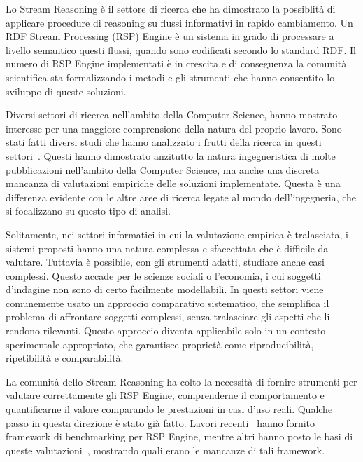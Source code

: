 Lo Stream Reasoning \`e  il settore di ricerca che ha dimostrato la possiblit\`a di applicare procedure di reasoning su flussi informativi in rapido cambiamento. Un RDF Stream Processing (RSP) Engine \`e  un sistema in grado di processare a livello semantico questi flussi, quando sono codificati secondo lo standard RDF. Il numero di RSP Engine implementati \`e  in crescita e di conseguenza la comunit\`a scientifica sta formalizzando i metodi e gli strumenti che hanno consentito lo sviluppo di queste soluzioni.

Diversi settori di ricerca nell'ambito della Computer Science, hanno mostrato interesse per una maggiore comprensione della natura del proprio lavoro. Sono stati fatti diversi studi che hanno analizzato i frutti della ricerca in questi settori~\cite{Tichy:1995:EEC:209090.209093, Wainer:2009:EEC:1518331.1518552}. Questi hanno dimostrato anzitutto la natura ingegneristica di molte pubblicazioni nell'ambito della Computer Science, ma anche una discreta mancanza di valutazioni empiriche delle soluzioni implementate. Questa \`e  una differenza evidente con le altre aree di ricerca legate al mondo dell'ingegneria, che si focalizzano su questo tipo di analisi.

Solitamente, nei settori informatici in cui la valutazione empirica \`e tralasciata, i sistemi proposti hanno una natura complessa e sfaccettata che \`e difficile da valutare. Tuttavia \`e  possibile, con gli strumenti adatti, studiare anche casi complessi. Questo accade per le scienze sociali o l'economia, i cui soggetti d'indagine non sono di certo facilmente modellabili. In questi settori viene comunemente usato un approccio comparativo sistematico, che semplifica il problema di affrontare soggetti complessi, senza tralasciare gli aspetti che li rendono rilevanti. Questo approccio diventa applicabile solo in un contesto sperimentale appropriato, che garantisce propriet\`a come riproducibilit\`a, ripetibilit\`a e comparabilit\`a.

La comunit\`a dello Stream Reasoning ha colto la necessit\`a di fornire strumenti per valutare correttamente gli RSP Engine,  comprenderne il comportamento e quantificarne il valore comparando le prestazioni in casi d'uso reali. Qualche passo in questa direzione \`e  stato gi\`a fatto. Lavori recenti~\cite{Zhang2012, LePhuoc2012c, DBLP:conf/semweb/DellAglioCBCV13} hanno fornito framework di benchmarking per RSP Engine, mentre altri hanno posto le basi di queste valutazioni~\cite{DBLP:conf/esws/ScharrenbachUMVB13}, mostrando quali erano le mancanze di tali framework.

